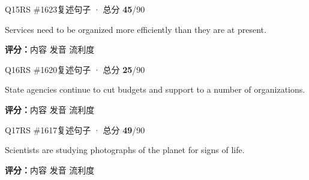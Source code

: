 \begin{qblock}{Q15\quad RS \#1623}{复述句子 · 总分 \textcolor{cAccent}{\bfseries 45}/90}
\begin{promptbox}
Services need to be organized more efficiently than they are at present.
\end{promptbox}
\asrlegend
\begin{asrbox}
           
\end{asrbox}
\smallskip
{\small\textbf{评分：}内容  \quad\textperiodcentered\quad 发音  \quad\textperiodcentered\quad 流利度 }
\end{qblock}

\begin{qblock}{Q16\quad RS \#1620}{复述句子 · 总分 \textcolor{cAccent}{\bfseries 25}/90}
\begin{promptbox}
State agencies continue to cut budgets and support to a number of organizations.
\end{promptbox}
\asrlegend
\begin{asrbox}
            
\end{asrbox}
\smallskip
{\small\textbf{评分：}内容  \quad\textperiodcentered\quad 发音  \quad\textperiodcentered\quad 流利度 }
\end{qblock}

\begin{qblock}{Q17\quad RS \#1617}{复述句子 · 总分 \textcolor{cAccent}{\bfseries 49}/90}
\begin{promptbox}
Scientists are studying photographs of the planet for signs of life.
\end{promptbox}
\asrlegend
\begin{asrbox}
          
\end{asrbox}
\smallskip
{\small\textbf{评分：}内容  \quad\textperiodcentered\quad 发音  \quad\textperiodcentered\quad 流利度 }
\end{qblock}

